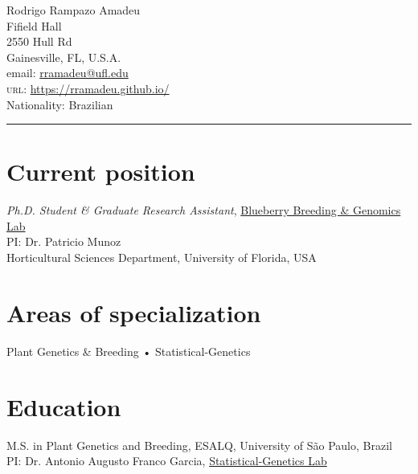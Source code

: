 \documentclass[10pt, a4paper]{article}
\newcommand{\years}[1]{\marginnote{\scriptsize #1}}
\begin{document}
{\LARGE Rodrigo Rampazo Amadeu}\\[1cm]
 Fifield Hall\\
 2550  Hull Rd\\
Gainesville, FL, U.S.A.\\[.2cm]
email: \href{mailto:rramadeu@ufl.edu}{rramadeu@ufl.edu}\\
\textsc{url}: \href{https://rramadeu.github.io/}{https://rramadeu.github.io/}\\ 
Nationality:  Brazilian\\
\hrule
\section*{Current position}
\emph{Ph.D. Student \& Graduate Research Assistant}, \href{https://www.blueberrybreeding.com}{Blueberry Breeding \& Genomics Lab}\\
PI: Dr. Patricio Munoz\\
Horticultural Sciences Department, University of Florida, USA

\section*{Areas of specialization}
 Plant Genetics \& Breeding • Statistical-Genetics


\section*{Education}
\noindent
\years{2018}\textsc{M.S.} in Plant Genetics and Breeding, ESALQ, University of São Paulo, Brazil\\
PI: Dr. Antonio Augusto Franco Garcia, \href{http://statgen.esalq.usp.br}{Statistical-Genetics Lab}\\
\end{document}
